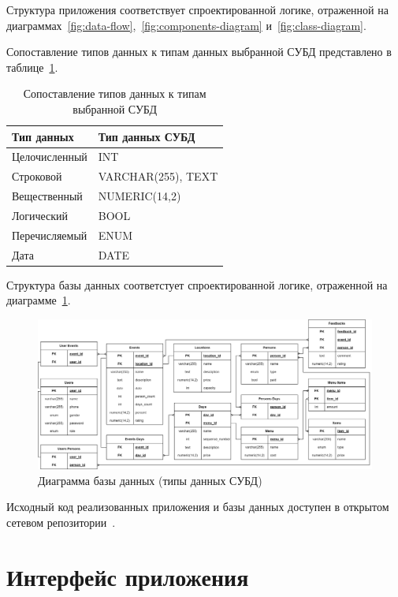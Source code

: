Структура приложения соответствует спроектированной логике, отраженной на диаграммах~\ref{fig:data-flow},~\ref{fig:components-diagram} и~\ref{fig:class-diagram}.

Сопоставление типов данных к типам данных выбранной СУБД представлено в таблице~\ref{tbl:db-types}.

\begin{table}[h]
	\centering
	\caption{Сопоставление типов данных к типам выбранной СУБД}
	\label{tbl:db-types}
	\begin{tabularx}{\textwidth}{|X|X|}
		\hline
		\textbf{Тип данных} & \textbf{Тип данных СУБД} \\
		\hline
		Целочисленный & INT \\
		\hline
		Строковой & VARCHAR(255), TEXT \\
		\hline 
		Вещественный & NUMERIC(14,2) \\
		\hline
		Логический & BOOL \\
		\hline 
		Перечисляемый & ENUM \\
		\hline
		Дата & DATE \\
		\hline
	\end{tabularx}
\end{table}

Структура базы данных соответстует спроектированной логике, отраженной на диаграмме~\ref{fig:db-diagram}.

\begin{figure}[h!]
	\centering
	\includegraphics[width=1\textwidth]{images/db-diagram.png}
	\caption{Диаграмма базы данных (типы данных СУБД)} 
	\label{fig:db-diagram} 
\end{figure}

Исходный код реализованных приложения и базы данных доступен в открытом сетевом репозитории~\cite{lit17, lit18}.

\section{Интерфейс приложения}

